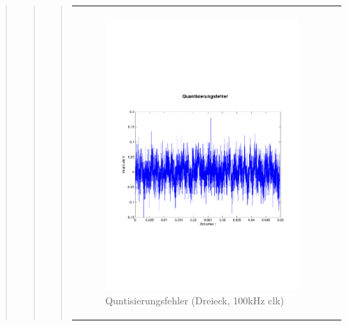 \begin{quote}
\begin{quote}
\begin{quote}
            \begin{center}
                \begin{tabular}{ll}
                
                \hspace{-4cm}
                    
                    \begin{minipage}{0.55\textwidth}
                        \begin{figure}[H]
                            \includegraphics[scale=0.4, trim = 0cm 7cm 0cm
                            7.5cm, clip]
                            {./Bilder/drei100_Quantisierungsfehler}
                              \caption{Quntisierungsfehler (Dreieck, 100kHz clk)}
                        \end{figure}
                    \end{minipage}
                                  

\end{tabular}
\end{center}
\end{quote}
\end{quote}
\end{quote}
